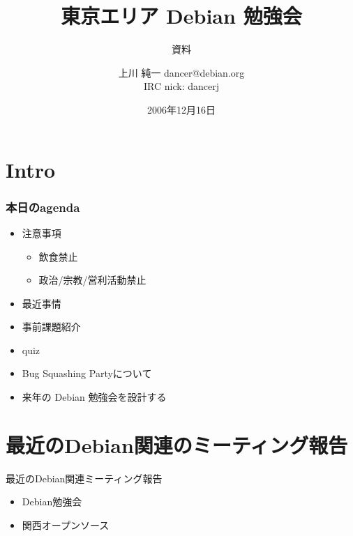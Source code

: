 \documentclass[cjk,dvipdfmx]{beamer}
\title{東京エリア Debian 勉強会}
\subtitle{資料}
\author{上川 純一 dancer@debian.org\\IRC nick: dancerj}
\date{2006年12月16日}
\begin{document}
\frame{\titlepage{}}

\section{Intro}

\begin{frame}
 \frametitle{本日のagenda}
\begin{minipage}[t]{0.4\hsize}
  \begin{itemize}
  \item 注意事項
	\begin{itemize}
	 \item 飲食禁止
	 \item 政治/宗教/営利活動禁止
	\end{itemize}
  \item 最近事情
  \item 事前課題紹介
  \item quiz
 \end{itemize}
\end{minipage} 
\begin{minipage}[t]{0.4\hsize}
 \begin{itemize}
  \item Bug Squashing Partyについて
  \item 来年の Debian 勉強会を設計する
 \end{itemize}
\end{minipage}
\end{frame}

\section{最近のDebian関連のミーティング報告}

\begin{frame}{最近のDebian関連ミーティング報告}
 \begin{itemize}
  \item Debian勉強会
  \item 関西オープンソース
 \end{itemize}
\end{frame}
\end{document}
